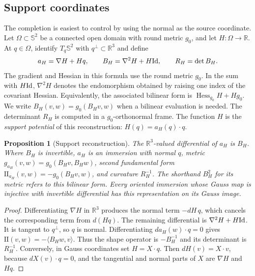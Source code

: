 \documentclass[11pt]{amsart}
\newtheorem{proposition}[theorem]{Proposition}
\theoremstyle{definition}
\theoremstyle{remark}
\newcommand{\R}{\mathbb R}\newcommand{\Sph}{\mathbb S}
\newcommand{\II}{\mathrm{II}}\newcommand{\Gmap}{\mathcal G}
\numberwithin{equation}{section}
\begin{document}
\subsection{Support coordinates}\label{sec:support}
The completion is easiest to control by using the normal as the source
coordinate. Let $\Omega\subset\Sph^2$ be a connected open domain with
round metric $g_0$, and let $H:\Omega\to\R$. At $q\in\Omega$, identify
$T_q\Sph^2$ with $q^\perp\subset\R^3$ and define
\begin{equation}\label{eq:support}
 a_H=\nabla H+Hq,\qquad B_H=\nabla^2H+H\mathrm{Id},
 \qquad R_H=\det B_H.
\end{equation}
The gradient and Hessian in this formula use the round metric $g_0$.
In the sum with $H\mathrm{Id}$, $\nabla^2H$ denotes the endomorphism obtained
by raising one index of the covariant Hessian. Equivalently, the
associated bilinear form is $\operatorname{Hess}_{g_0}H+Hg_0$.
We write $B_H(v,w)=g_0(B_Hv,w)$ when a bilinear evaluation is needed.
The determinant $R_H$ is computed in a $g_0$-orthonormal frame.
The function $H$ is the \emph{support potential} of this reconstruction:
$H(q)=a_H(q)\cdot q$.

\begin{proposition}[Support reconstruction]\label{prop:support}
The $\R^3$-valued differential of $a_H$ is $B_H$. Where $B_H$ is
invertible, $a_H$ is an immersion with normal $q$, metric
$g_{a_H}(v,w)=g_0(B_Hv,B_Hw)$, second fundamental form
$\II_{a_H}(v,w)=-g_0(B_Hv,w)$, and curvature $R_H^{-1}$.
The shorthand $B_H^2$ for its metric refers to this bilinear form. Every
oriented immersion whose Gauss map is injective with invertible
differential has this representation on its Gauss image.
\end{proposition}
\begin{proof}
Differentiating $\nabla H$ in $\R^3$ produces the normal term
$-dH\,q$, which cancels the corresponding term from $d(Hq)$.
The remaining differential is $\nabla^2H+H\mathrm{Id}$. It is tangent to
$q^\perp$, so $q$ is normal. Differentiating $da_H(w)\cdot q=0$ gives
$\II(v,w)=-\langle B_Hw,v\rangle$. Thus the shape operator is
$-B_H^{-1}$ and its determinant is $R_H^{-1}$.
Conversely, in Gauss coordinates set $H=X\cdot q$. Then
$dH(v)=X\cdot v$, because $dX(v)\cdot q=0$, and the tangential and normal
parts of $X$ are $\nabla H$ and $Hq$.
\end{proof}
\end{document}
